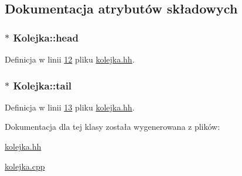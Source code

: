 \subsection{Dokumentacja atrybutów składowych}
\hypertarget{class_kolejka_a3d36327a29f61dc107ca0147ab4cbc52}{
\subsubsection[{head}]{$\ast$ Kolejka\-::head\hspace{0.3cm}{\ttfamily [private]}}}\label{class_kolejka_a3d36327a29f61dc107ca0147ab4cbc52}


Definicja w linii \hyperlink{kolejka_8hh_source_l00012}{12} pliku \hyperlink{kolejka_8hh_source}{kolejka.\-hh}.

\hypertarget{class_kolejka_a9e4cb4e670cf69985de2a92e479d327f}{
\subsubsection[{tail}]{$\ast$ Kolejka\-::tail\hspace{0.3cm}{\ttfamily [private]}}}\label{class_kolejka_a9e4cb4e670cf69985de2a92e479d327f}


Definicja w linii \hyperlink{kolejka_8hh_source_l00013}{13} pliku \hyperlink{kolejka_8hh_source}{kolejka.\-hh}.



Dokumentacja dla tej klasy została wygenerowana z plików\-:\begin{DoxyCompactItemize}
\item 
\hyperlink{kolejka_8hh}{kolejka.\-hh}\item 
\hyperlink{kolejka_8cpp}{kolejka.\-cpp}\end{DoxyCompactItemize}
